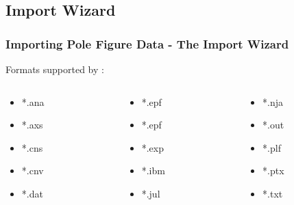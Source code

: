 \subsection*{Import Wizard}



\begin{frame}[fragile]
  \frametitle{Importing Pole Figure Data - The Import Wizard}

  Formats supported by \MTEX:

  \begin{columns}
	
		\begin{column}{2cm}
      \begin{itemize}
	\item *.ana   	
	\item *.axs 		
  \item *.cns 	
  \item 	*.cnv 	
  \item 	*.dat
	    \end{itemize}
    \end{column}
	\begin{column}{2cm}
      \begin{itemize}
  \item 	*.epf
  \item 	*.epf
  \item 	*.exp 	
  \item 	*.ibm 	
  \item 	*.jul 
		   \end{itemize}
    \end{column}
	
	\begin{column}{2cm}
      \begin{itemize}
  \item 	*.nja 	
  \item 	*.out 	
  \item 	*.plf 	
  \item 	*.ptx
  \item 	*.txt 
		   \end{itemize}
    \end{column}
	

\end{columns}
\end{frame}
